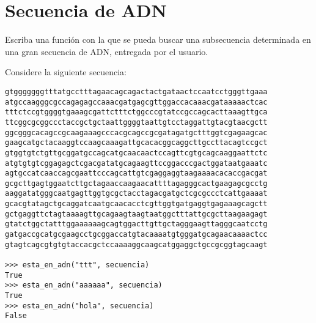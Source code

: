 \section{Secuencia de ADN}

Escriba una función con la que se pueda buscar una subsecuencia
determinada en una gran secuencia de ADN, entregada por el usuario.

Considere la siguiente secuencia:

\begin{lstlisting}
gtgggggggtttatgcctttagaacagcagactactgataactccaatcctgggttgaaa
atgccaagggcgccagagagccaaacgatgagcgttggaccacaaacgataaaaactcac
tttctccgtggggtgaaagcgattctttctggcccgtatccgccagcacttaaagttgca
ttcggcgcggccctaccgctgctaattggggtaattgtcctaggattgtacgtaacgctt
ggcgggcacagccgcaagaaagcccacgcagccgcgatagatgctttggtcgagaagcac
gaagcatgctacaaggtccaagcaaagattgcacacggcaggcttgccttacagtccgct
gtggtgtctgttgcggatgccagcatgcaacaactccagttcgtgcagcaaggaattctc
atgtgtgtcggagagctcgacgatatgcagaagttccggacccgactggataatgaaatc
agtgccatcaaccagcgaattcccagcattgtcgaggaggtaagaaaacacaccgacgat
gcgcttgagtggaatcttgctagaaccaagaacattttagagggcactgaagagcgcctg
aaggatatgggcaatgagttggtgcgctacctagacgatgctcgcgccctcattgaaaat
gcacgtatagctgcaggatcaatgcaacacctcgttggtgatgaggtgagaaagcagctt
gctgaggttctagtaaaagttgcagaagtaagtaatggctttattgcgcttaagaagagt
gtatctggctatttggaaaaaagcagtggacttgttgctagggaagttagggcaatcctg
gatgaccgcatgcgaagcctgcggaccatgtacaaaatgtgggatgcagaacaaaactcc
gtagtcagcgtgtgtaccacgctccaaaaggcaagcatggaggctgccgcggtagcaagt

>>> esta_en_adn("ttt", secuencia)
True
>>> esta_en_adn("aaaaaa", secuencia)
True
>>> esta_en_adn("hola", secuencia)
False
\end{lstlisting}

